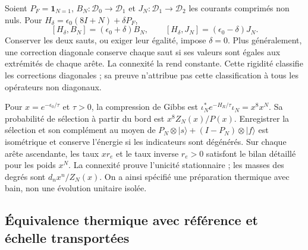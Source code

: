 Soient $P_F=\mathbf1_{N=1}$, $B_N:\mathcal D_0\to\mathcal D_1$ et
$J_N:\mathcal D_1\to\mathcal D_2$ les courants comprimés non nuls.
Pour $H_\delta=\epsilon_0(8I+N)+\delta P_F$,
\[
 [H_\delta,B_N]=(\epsilon_0+\delta)B_N,
 \qquad[H_\delta,J_N]=(\epsilon_0-\delta)J_N.
\]
Conserver les deux sauts, ou exiger leur égalité, impose $\delta=0$.
Plus généralement, une correction diagonale conserve chaque saut si ses
valeurs sont égales aux extrémités de chaque arête. La connexité la
rend constante. Cette rigidité classifie les corrections diagonales ; sa preuve
n’attribue pas cette classification à tous les opérateurs non diagonaux.

Pour $x=e^{-\epsilon_0/\tau}$ et $\tau>0$, la compression de Gibbs est
$\iota_N^*e^{-H_R/\tau}\iota_N=x^8x^N$. Sa probabilité de sélection
à partir du bord est $x^8Z_N(x)/P(x)$. Enregistrer la sélection et son complément
au moyen de $P_N\otimes|s\rangle+(I-P_N)\otimes|f\rangle$ est isométrique
et conserve l’énergie si les indicateurs sont dégénérés. Sur chaque arête
ascendante, les taux $xr_e$ et le taux inverse $r_e>0$ satisfont le bilan
détaillé pour les poids $x^N$. La connexité prouve l’unicité
stationnaire ; les masses des degrés sont $d_nx^n/Z_N(x)$. On a
ainsi spécifié une préparation thermique avec bain, non une évolution
unitaire isolée.

\subsection{Équivalence thermique avec référence et échelle transportées}
\label{sec:ii-ter27-equivalencia}

